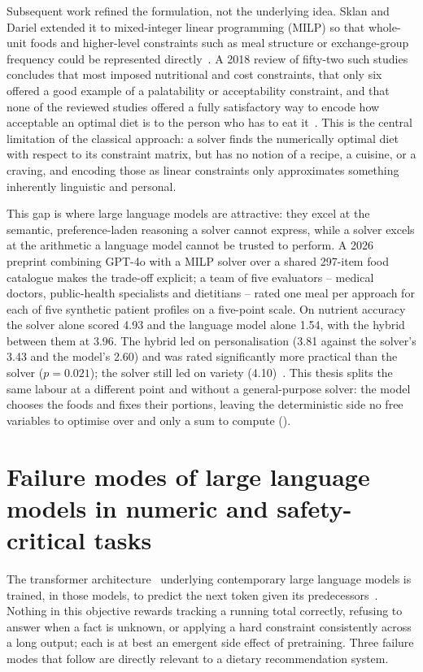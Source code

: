 Subsequent work refined the formulation, not the underlying idea. Sklan and Dariel extended it to mixed-integer linear programming (MILP) so that whole-unit foods and higher-level constraints such as meal structure or exchange-group frequency could be represented directly~\cite{sklan1993diet}. A 2018 review of fifty-two such studies concludes that most imposed nutritional and cost constraints, that only six offered a good example of a palatability or acceptability constraint, and that none of the reviewed studies offered a fully satisfactory way to encode how acceptable an optimal diet is to the person who has to eat it~\cite{vandooren2018review}. This is the central limitation of the classical approach: a solver finds the numerically optimal diet with respect to its constraint matrix, but has no notion of a recipe, a cuisine, or a craving, and encoding those as linear constraints only approximates something inherently linguistic and personal.

This gap is where large language models are attractive: they excel at the semantic, preference-laden reasoning a solver cannot express, while a solver excels at the arithmetic a language model cannot be trusted to perform. A 2026 preprint combining GPT-4o with a MILP solver over a shared \num{297}-item food catalogue makes the trade-off explicit; a team of five evaluators -- medical doctors, public-health specialists and dietitians -- rated one meal per approach for each of five synthetic patient profiles on a five-point scale. On nutrient accuracy the solver alone scored \num{4.93} and the language model alone \num{1.54}, with the hybrid between them at \num{3.96}. The hybrid led on personalisation (\num{3.81} against the solver's \num{3.43} and the model's \num{2.60}) and was rated significantly more practical than the solver ($p = \num{0.021}$); the solver still led on variety (\num{4.10})~\cite{alkeyeva2026chatgpt}. This thesis splits the same labour at a different point and without a general-purpose solver: the model chooses the foods and fixes their portions, leaving the deterministic side no free variables to optimise over and only a sum to compute ().

\section{Failure modes of large language models in numeric and safety-critical tasks}
\label{sec:background-llm-failure-modes}

The transformer architecture~\cite{vaswani2017attention} underlying contemporary large language models is trained, in those models, to predict the next token given its predecessors~\cite{brown2020language}. Nothing in this objective rewards tracking a running total correctly, refusing to answer when a fact is unknown, or applying a hard constraint consistently across a long output; each is at best an emergent side effect of pretraining. Three failure modes that follow are directly relevant to a dietary recommendation system.

